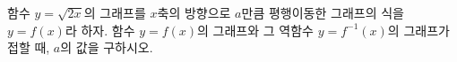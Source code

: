 \hspace*{2mm}\begin{minipage}[t]{\dimexpr\linewidth-2mm\relax}\vspace{0pt}
함수 $y=\sqrt{2x}$의 그래프를 $x$축의 방향으로 $a$만큼 평행이동한 그래프의 식을 $y=f(x)$라 하자. 함수 $y=f(x)$의 그래프와 그 역함수 $y=f^{-1}(x)$의 그래프가 접할 때, $a$의 값을 구하시오.\end{minipage}
